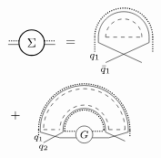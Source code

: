 \documentclass[aps,pra,reprint,superscriptaddress,twocolumn,notitlepage]{revtex4-1}
\numberwithin{equation}{section}
\begin{document}
\begin{widetext}


\begin{equation}\label{eq:self_energy_general_case}
\begin{aligned}
&\tikz[baseline=-0.5ex]{
    \draw[densely dotted,thick] (0.35,0.05)--(0.65,0.05);
    \draw[densely dotted,thick] (-0.35,0.05)--(-0.65,0.05);
    \draw (0.35,-0.05)--(0.65,-0.05);
    \draw (-0.35,-0.05)--(-0.65,-0.05);
    \draw[thick] (0,0) circle (10pt) node[anchor=center] {$\Sigma$};
    }
\ \, = \ \,
\tikz[baseline=-1.5ex]{
    \draw[dashed] (0,0) -- (1,0);
    \draw (-0.2,0.0)-- (-0.2,-0.15);
    \draw (-0.2,-0.15)-- (1.,-0.7);
    \draw (1.2,-0.15)-- (1.2,0.0);
    \draw (1.2,-0.15)-- (0,-0.7);
    \draw[densely dotted,thick] (-0.3,0.0)-- (-0.3,-0.4);
    \draw[densely dotted,thick] (1.3,-0.4)-- (1.3,0.0);
    \draw[dashed] (1,0) arc (0:180:0.5);
    \draw (1.2,0) arc (0:180:0.7);
    \draw[densely dotted,thick] (1.3,0) arc (0:180:0.8);
    \draw (-0.,-0.9) circle (0.) node[anchor=center] {\footnotesize$\bar{q}_1$};
    \draw (-0.3,-0.55) circle (0.) node[anchor=center] {\footnotesize$q_1$};
    }
\\
&+
 \ \,
\tikz[scale=0.45,baseline=2ex]{
    \draw[dashed] (0,0) -- (1,0);
    \draw (-0.2,0.)-- (-0.2,-0.15);
    \draw (-0.2,-0.15)-- (1.,-0.5);
    \draw (1.2,-0.15)-- (1.2,0.0);
    \draw (1.2,-0.15)-- (0,-0.8);
    \draw[densely dotted,thick] (-0.3,0.)-- (-0.3,-0.4);
    \draw[densely dotted,thick] (1.3,-0.1)-- (1.3,0.);
    \draw[dashed] (4,0) -- (5,0);
    \draw (3.8,0.)-- (3.8,-0.15);
    \draw (3.8,-0.15)-- (5.,-0.7);
    \draw (5.2,-0.15)-- (5.2,0.);
    \draw (5.2,-0.15)-- (4,-0.5);
    \draw[densely dotted,thick] (3.7,0.)-- (3.7,-0.1);
    \draw[densely dotted,thick] (5.3,-0.1)-- (5.3,0.);
    \draw[densely dotted,thick] (5.3,-0.4)-- (5.3,0.);
    \draw[densely dotted,thick] (1.3,-0.1)--(2,-0.1);
    \draw[densely dotted,thick] (3,-0.1)--(3.7,-0.1);
    \draw (1.0,-0.5)-- (2,-0.5);
    \draw (3.0,-0.5)-- (4,-0.5);
    \draw[densely dotted,thick] (3.7,0) arc (0:180:1.2);
    \draw[densely dotted,thick] (5.3,0) arc (0:180:2.8);
    \draw[dashed] (5.,0) arc (0:180:2.5);
    \draw[dashed] (4.,0) arc (0:180:1.5);
    \draw (3.8,0) arc (0:180:1.3);
    \draw (5.2,0) arc (0:180:2.7);
    \draw (2.5,-0.3) circle (.52) node[anchor=center] {\footnotesize$G$};
    \draw (-0.,-1.1) circle (0.) node[anchor=center] {\scriptsize $q_2$};
    \draw (-0.3,-0.55) circle (0.) node[anchor=center] {\scriptsize $q_1$};
}
\end{aligned}
\end{equation}
\end{widetext}
\end{document}
